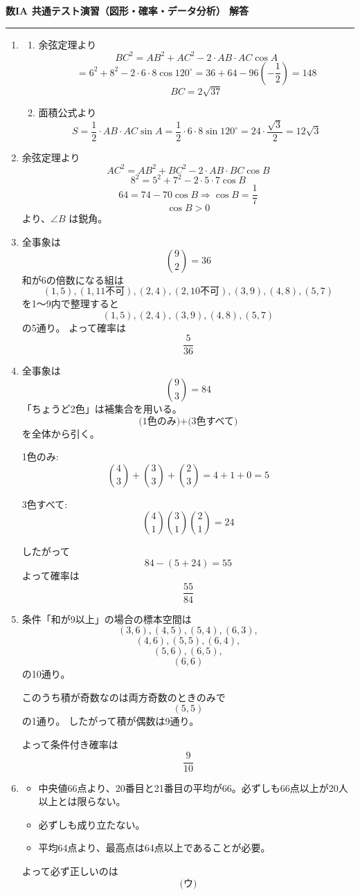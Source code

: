 \documentclass[lualatex,ja=standard]{bxjsarticle}
\begin{document}
\noindent\textbf{数IA 共通テスト演習（図形・確率・データ分析） 解答}
\hrule
\vspace{0.8em}

\begin{enumerate}
\item
\begin{enumerate}[label=(\arabic*)]
\item 余弦定理より
\[
BC^2=AB^2+AC^2-2\cdot AB\cdot AC\cos A
\]
\[
=6^2+8^2-2\cdot6\cdot8\cos120^\circ
=36+64-96\left(-\frac12\right)=148
\]
\[
BC=2\sqrt{37}
\]
\item 面積公式より
\[
S=\frac12\cdot AB\cdot AC\sin A
=\frac12\cdot6\cdot8\sin120^\circ
=24\cdot\frac{\sqrt3}{2}
=12\sqrt3
\]
\end{enumerate}

\item 余弦定理より
\[
AC^2=AB^2+BC^2-2\cdot AB\cdot BC\cos B
\]
\[
8^2=5^2+7^2-2\cdot5\cdot7\cos B
\]
\[
64=74-70\cos B
\Rightarrow \cos B=\frac{1}{7}
\]
\[
\cos B>0
\]
より、$\angle B$ は鋭角。

\item 全事象は
\[
\binom92=36
\]
和が6の倍数になる組は
\[
(1,5),(1,11\text{不可}),(2,4),(2,10\text{不可}),(3,9),(4,8),(5,7)
\]
を1〜9内で整理すると
\[
(1,5),(2,4),(3,9),(4,8),(5,7)
\]
の5通り。
よって確率は
\[
\frac{5}{36}
\]

\item 全事象は
\[
\binom93=84
\]
「ちょうど2色」は補集合を用いる。
\[
\text{(1色のみ)}+\text{(3色すべて)}
\]
を全体から引く。

1色のみ:
\[
\binom43+\binom33+\binom23=4+1+0=5
\]

3色すべて:
\[
\binom41\binom31\binom21=24
\]

したがって
\[
84-(5+24)=55
\]
よって確率は
\[
\frac{55}{84}
\]

\item 条件「和が9以上」の場合の標本空間は
\[
(3,6),(4,5),(5,4),(6,3),
\]
\[
(4,6),(5,5),(6,4),
\]
\[
(5,6),(6,5),
\]
\[
(6,6)
\]
の10通り。

このうち積が奇数なのは両方奇数のときのみで
\[
(5,5)
\]
の1通り。
したがって積が偶数は9通り。

よって条件付き確率は
\[
\frac{9}{10}
\]

\item
\begin{itemize}
\item[(ア)] 中央値66点より、20番目と21番目の平均が66。必ずしも66点以上が20人以上とは限らない。
\item[(イ)] 必ずしも成り立たない。
\item[(ウ)] 平均64点より、最高点は64点以上であることが必要。
\end{itemize}
よって必ず正しいのは
\[
\text{(ウ)}
\]


\end{enumerate}
\end{document}
